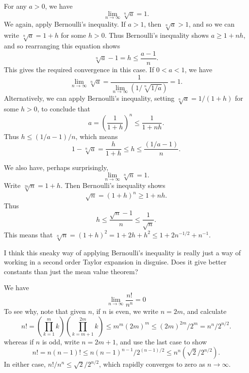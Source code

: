 \begin{example}
    For any $a > 0$, we have
    \[ \lim_{n \to \infty} \sqrt[n]{a} = 1. \]
    We again, apply Bernoulli's inequality. If $a > 1$, then $\sqrt[n]{a} > 1$, and so we can write $\sqrt[n]{a} = 1 + h$ for some $h > 0$. Thus Bernoulli's inequality shows $a \geq 1 + nh$, and so rearranging this equation shows
    \[ \sqrt[n]{a} - 1 = h \leq \frac{a - 1}{n}. \]
    This gives the required convergence in this case. If $0 < a < 1$, we have
    \[ \lim_{n \to \infty} \sqrt[n]{a} = \frac{1}{\lim_{n\to \infty}(1/\sqrt[n]{1/a})} = 1. \]
    Alternatively, we can apply Bernoulli's inequality, setting $\sqrt[n]{a} = 1/(1 + h)$ for some $h > 0$, to conclude that
    \[ a = \left( \frac{1}{1 + h} \right)^n \leq \frac{1}{1 + nh}. \]
    Thus $h \leq (1/a - 1)/n$, which means
    \[ 1 - \sqrt[n]{a} = \frac{h}{1 + h} \leq h \leq \frac{(1/a - 1)}{n}. \]
\end{example}

\begin{example}
    We also have, perhaps surprisingly,
    \[ \lim_{n \to \infty} \sqrt[n]{n} = 1. \]
    Write $\sqrt[2n]{n} = 1 + h$. Then Bernoulli's inequality shows
    \[ \sqrt{n} = (1 + h)^n \geq 1 + nh. \]
    Thus
    \[ h \leq \frac{\sqrt{n} - 1}{n} \leq \frac{1}{\sqrt{n}}. \]
    This means that $\sqrt[n]{n} = (1 + h)^2 = 1 + 2h + h^2 \leq 1 + 2n^{-1/2} + n^{-1}$.
\end{example}

\begin{remark}
    I think this sneaky way of applying Bernoulli's inequality is really just a way of working in a second order Taylor expansion in disguise. Does it give better constants than just the mean value theorem?
\end{remark}

\begin{example}
    We have
    \[ \lim_{n \to \infty} \frac{n!}{n^n} = 0 \]
    To see why, note that given $n$, if $n$ is even, we write $n = 2m$, and calculate
    \[ n! = \left( \prod_{k = 1}^m k \right) \left( \prod_{k = m+1}^{2m} k \right) \leq m^m (2m)^m \leq (2m)^{2m} / 2^m = n^n/2^{n/2}. \]
    whereas if $n$ is odd, write $n = 2m + 1$, and use the last case to show
    \[ n! = n(n-1)! \leq n(n-1)^{n-1}/2^{(n-1)/2} \leq n^n (\sqrt{2}/2^{n/2}). \]
    In either case, $n!/n^n \leq \sqrt{2}/2^{n/2}$, which rapidly converges to zero as $n \to \infty$.
\end{example}

